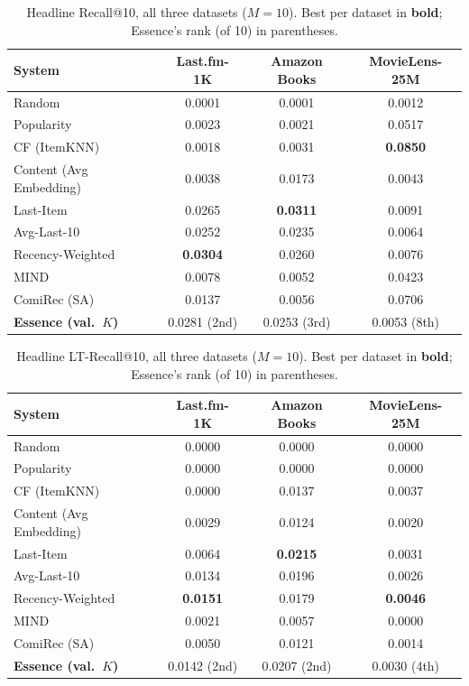 \documentclass{article}
\begin{document}
\begin{table}[t]
\centering
\caption{Headline Recall@10, all three datasets ($M=10$). Best per dataset in \textbf{bold}; Essence's rank (of 10) in parentheses.}
\label{tab:headline-recall}
\small
\begin{tabular}{lccc}
\toprule
\textbf{System} & \textbf{Last.fm-1K} & \textbf{Amazon Books} & \textbf{MovieLens-25M} \\
\midrule
Random & 0.0001 & 0.0001 & 0.0012 \\
Popularity & 0.0023 & 0.0021 & 0.0517 \\
CF (ItemKNN) & 0.0018 & 0.0031 & \textbf{0.0850} \\
Content (Avg Embedding) & 0.0038 & 0.0173 & 0.0043 \\
Last-Item & 0.0265 & \textbf{0.0311} & 0.0091 \\
Avg-Last-10 & 0.0252 & 0.0235 & 0.0064 \\
Recency-Weighted & \textbf{0.0304} & 0.0260 & 0.0076 \\
MIND & 0.0078 & 0.0052 & 0.0423 \\
ComiRec (SA) & 0.0137 & 0.0056 & 0.0706 \\
\textbf{Essence (val.\ $K$)} & 0.0281 (2nd) & 0.0253 (3rd) & 0.0053 (8th) \\
\bottomrule
\end{tabular}
\end{table}

\begin{table}[t]
\centering
\caption{Headline LT-Recall@10, all three datasets ($M=10$). Best per dataset in \textbf{bold}; Essence's rank (of 10) in parentheses.}
\label{tab:headline-lt}
\small
\begin{tabular}{lccc}
\toprule
\textbf{System} & \textbf{Last.fm-1K} & \textbf{Amazon Books} & \textbf{MovieLens-25M} \\
\midrule
Random & 0.0000 & 0.0000 & 0.0000 \\
Popularity & 0.0000 & 0.0000 & 0.0000 \\
CF (ItemKNN) & 0.0000 & 0.0137 & 0.0037 \\
Content (Avg Embedding) & 0.0029 & 0.0124 & 0.0020 \\
Last-Item & 0.0064 & \textbf{0.0215} & 0.0031 \\
Avg-Last-10 & 0.0134 & 0.0196 & 0.0026 \\
Recency-Weighted & \textbf{0.0151} & 0.0179 & \textbf{0.0046} \\
MIND & 0.0021 & 0.0057 & 0.0000 \\
ComiRec (SA) & 0.0050 & 0.0121 & 0.0014 \\
\textbf{Essence (val.\ $K$)} & 0.0142 (2nd) & 0.0207 (2nd) & 0.0030 (4th) \\
\bottomrule
\end{tabular}
\end{table}
\end{document}
